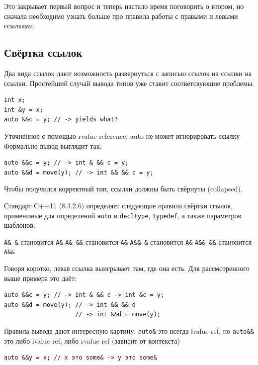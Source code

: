 \documentclass[a4paper,12pt,oneside]{book}
\begin{document}
Это закрывает первый вопрос и теперь настало время поговорить о втором, но сначала необходимо узнать больше про правила работы с правыми и левыми ссылками.

\subsection{Свёртка ссылок}\label{ReferenceConvolution}

Два вида ссылок дают возможность развернуться с записью ссылок на ссылки на ссылки. Простейший случай вывода типов уже ставит соответсвующие проблемы.

\begin{lstlisting}
int x;
int &y = x;
auto &&c = y; // -> yields what?
\end{lstlisting}

Уточнённое с помощью rvalue reference, auto не может игнорировать ссылку
Формально вывод выглядит так:

\begin{lstlisting}
auto &&c = y; // -> int & && c = y;
auto &&d = move(y); // -> int && && c = y;
\end{lstlisting}

Чтобы получился корректный тип, ссылки должны быть свёрнуты (collapsed).

Стандарт C++11 (8.3.2.6) определяет следующие правила свёртки ссылок, применимые для определений \lstinline!auto! и \lstinline!decltype!, \lstinline!typedef!, а также параметров шаблонов:

\lstinline!A& &! становится \lstinline!A&!
\lstinline!A& &&! становится \lstinline!A&!
\lstinline!A&& &! становится \lstinline!A&!
\lstinline!A&& &&! становится \lstinline!A&&!

Говоря коротко, левая ссылка выигрывает там, где она есть. Для рассмотренного выше примера это даёт:

\begin{lstlisting}
auto &&c = y; // -> int & && c -> int &c = y;
auto &&d = move(y); // -> int && && d 
                    // -> int &&d = move(y);
\end{lstlisting}

Правила вывода дают интересную картину: \lstinline!auto&! это всегда lvalue ref, но \lstinline!auto&&! это либо lvalue ref, либо rvalue ref (зависит от контекста)

\begin{lstlisting}
auto &&y = x; // x это some& -> y это some&
\end{lstlisting}
\end{document}

